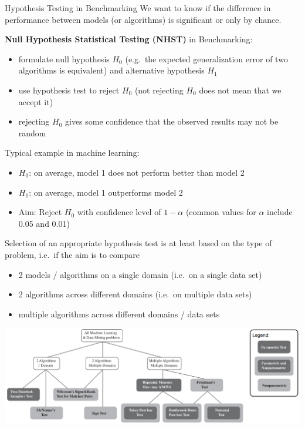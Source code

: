     \begin{frame}[c,allowframebreaks]{Hypothesis Testing in Benchmarking}
    We want to know if the difference in performance between models (or algorithms) is significant or only by chance.

    \textbf{Null Hypothesis Statistical Testing (NHST)} in Benchmarking:

    \begin{itemize}
    \item formulate null hypothesis $H_0$ (e.g.\ the expected generalization
        error of two algorithms is equivalent) and alternative hypothesis $H_1$
    \item use hypothesis test to reject $H_0$ (not rejecting $H_0$ does not mean that we accept it)
    \item rejecting $H_0$ gives some confidence that the observed results may
        not be random
    \end{itemize}

    Typical example in machine learning:

    \begin{itemize}
    \item $H_0$: on average, model 1 does not perform better than model 2
    \item $H_1$: on average, model 1 outperforms model 2
    \item Aim: Reject $H_0$ with confidence level of $1-\alpha$ (common values
        for $\alpha$ include 0.05 and 0.01)
    \end{itemize}

    \framebreak

    Selection of an appropriate hypothesis test is at least based on the type of
    problem, i.e.\ if the aim is to compare
    \begin{itemize}
    \item 2 models / algorithms on a single domain (i.e.\ on a single data set)
    \item 2 algorithms across different domains (i.e.\ on multiple data sets)
    \item multiple algorithms across different domains / data sets
    \end{itemize}

    \begin{center}
    \includegraphics[height=.5\textheight]{tests_overview.png}
    \end{center}

    \end{frame}


